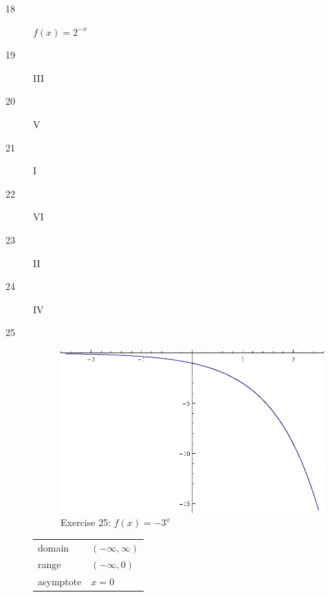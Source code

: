 \documentclass{exam}
\begin{document}
\begin{description}
    \item[18] $f(x) = 2^{-x}$

    \item[19] III

    \item[20] V

    \item[21] I

    \item[22] VI

    \item[23] II

    \item[24] IV

    \item[25] 
      \begin{figure}[H]
        \centering
        \includegraphics[scale=1.0]{exercise25.eps}
        \caption*{Exercise 25: $f(x) = -3^x$}
      \end{figure}

      \begin{tabular}[H]{ll}
        \toprule
        domain    & $(-\infty, \infty)$ \\
        range     & $(-\infty, 0)$ \\
        asymptote & $x = 0$ \\
        \bottomrule
      \end{tabular}

    \pagebreak


\end{description}
\end{document}
